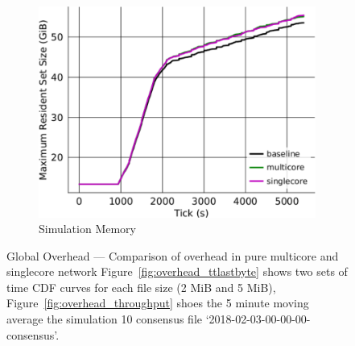 \begin{figure}[t]
\begin{subfigure}[t]{0.32\textwidth}
\includegraphics[clip, width=1.0\textwidth]{images/overhead_memory.pdf}
		\caption{Simulation Memory}
		\label{fig:overhead_shadow}
	\end{subfigure}
	\caption{Global Overhead --- Comparison of overhead in pure multicore
          and singlecore network %
          Figure~\ref{fig:overhead_ttlastbyte} shows two sets of %
          time CDF curves for each file size (2 MiB and 5 MiB), %
          Figure~\ref{fig:overhead_throughput} shoes the 5 minute moving average
          the %
          simulation %
          10 %
          consensus file `2018-02-03-00-00-00-consensus'.}
	\label{fig:overhead}
\end{figure}

